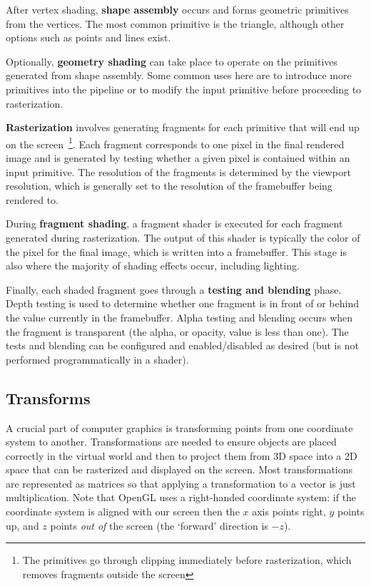 After vertex shading, \textbf{shape assembly} occurs and forms geometric primitives from the vertices. The most common primitive is the triangle, although other options such as points and lines exist.

Optionally, \textbf{geometry shading} can take place to operate on the primitives generated from shape assembly. Some common uses here are to introduce more primitives into the pipeline or to modify the input primitive before proceeding to rasterization.

\textbf{Rasterization} involves generating fragments for each primitive that will end up on the screen~\footnote{The primitives go through clipping immediately before rasterization, which removes fragments outside the screen}. Each fragment corresponds to one pixel in the final rendered image and is generated by testing whether a given pixel is contained within an input primitive. The resolution of the fragments is determined by the viewport resolution, which is generally set to the resolution of the framebuffer being rendered to.

During \textbf{fragment shading}, a fragment shader is executed for each fragment generated during rasterization. The output of this shader is typically the color of the pixel for the final image, which is written into a framebuffer. This stage is also where the majority of shading effects occur, including lighting.

Finally, each shaded fragment goes through a \textbf{testing and blending} phase. Depth testing is used to determine whether one fragment is in front of or behind the value currently in the framebuffer. Alpha testing and blending occurs when the fragment is transparent (the alpha, or opacity, value is less than one). The tests and blending can be configured and enabled/disabled as desired (but is not performed programmatically in a shader).

\subsection{Transforms}
A crucial part of computer graphics is transforming points from one coordinate system to another. Transformations are needed to ensure objects are placed correctly in the virtual world and then to project them from 3D space into a 2D space that can be rasterized and displayed on the screen. Most transformations are represented as matrices so that applying a transformation to a vector is just multiplication. Note that OpenGL uses a right-handed coordinate system: if the coordinate system is aligned with our screen then the $x$ axis points right, $y$ points up, and $z$ points \textit{out of} the screen (the `forward' direction is $-z$).

